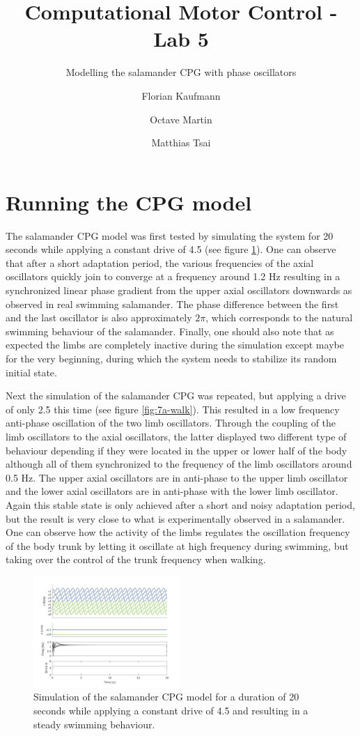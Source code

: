 \documentclass[a4paper]{scrartcl}
\title{Computational Motor Control - Lab 5}
\subtitle{Modelling the salamander CPG with phase oscillators}
\author{Florian Kaufmann \and Octave Martin \and Matthias Tsai}
\begin{document}
\twocolumn
\setlength{\columnsep}{0.5cm}
\maketitle

\section{Running the CPG model}

The salamander CPG model was first tested by simulating the system for 20 seconds while applying a constant drive of 4.5 (see figure \ref{fig:7a-swim}). One can observe that after a short adaptation period, the various frequencies of the axial oscillators quickly join to converge at a frequency around 1.2 Hz resulting in a synchronized linear phase gradient from the upper axial oscillators downwards as observed in real swimming salamander. The phase difference between the first and the last oscillator is also approximately $2\pi$, which corresponds to the natural swimming behaviour of the salamander. Finally, one should also note that as expected the limbs are completely inactive during the simulation except maybe for the very beginning, during which the system needs to stabilize its random initial state.

Next the simulation of the salamander CPG was repeated, but applying a drive of only 2.5 this time (see figure \ref{fig:7a-walk}). This resulted in a low frequency anti-phase oscillation of the two limb oscillators. Through the coupling of the limb oscillators to the axial oscillators, the latter displayed two different type of behaviour depending if they were located in the upper or lower half of the body although all of them synchronized to the frequency of the limb oscillators around 0.5 Hz. The upper axial oscillators are in anti-phase to the upper limb oscillator and the lower axial oscillators are in anti-phase with the lower limb oscillator. Again this stable state is only achieved after a short and noisy adaptation period, but the result is very close to what is experimentally observed in a salamander. One can observe how the activity of the limbs regulates the oscillation frequency of the body trunk by letting it oscillate at high frequency during swimming, but taking over the control of the trunk frequency when walking.

\begin{figure}[!h]	
	\includegraphics[width=0.5\textwidth]{fig/figure7a-swim.png}
	\caption{Simulation of the salamander CPG model for a duration of 20 seconds while applying a constant drive of 4.5 and resulting in a steady swimming behaviour.}
	\label{fig:7a-swim}
\end{figure}
\end{document}
